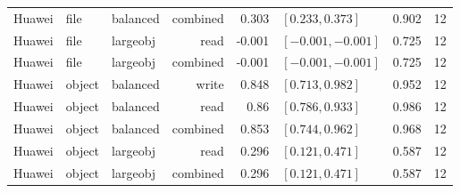 \begin{tabular}{lllrrlrl}
Huawei & file & balanced & combined & 0.303 & $[0.233, 0.373]$ & 0.902 & 12 \\
Huawei & file & largeobj & read & -0.001 & $[-0.001, -0.001]$ & 0.725 & 12 \\
Huawei & file & largeobj & combined & -0.001 & $[-0.001, -0.001]$ & 0.725 & 12 \\
Huawei & object & balanced & write & 0.848 & $[0.713, 0.982]$ & 0.952 & 12 \\
Huawei & object & balanced & read & 0.86 & $[0.786, 0.933]$ & 0.986 & 12 \\
Huawei & object & balanced & combined & 0.853 & $[0.744, 0.962]$ & 0.968 & 12 \\
Huawei & object & largeobj & read & 0.296 & $[0.121, 0.471]$ & 0.587 & 12 \\
Huawei & object & largeobj & combined & 0.296 & $[0.121, 0.471]$ & 0.587 & 12 \\
\bottomrule
\end{tabular}
